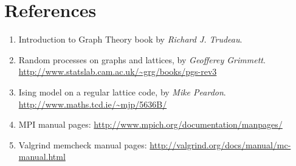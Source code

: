 \documentclass[pdftex,12pt,a4paper]{article}
\begin{document}
\newpage
\section{References}



\begin{enumerate}
\item Introduction to Graph Theory book by \emph{Richard J. Trudeau}. 
\item Random processes on graphs and lattices, by \emph{Geofferey Grimmett}. \url{http://www.statslab.cam.ac.uk/~grg/books/pgs-rev3}
\item Ising model on a regular lattice code, by \emph{Mike Peardon}. \url{http://www.maths.tcd.ie/~mjp/5636B/}
\item MPI manual pages: \url{http://www.mpich.org/documentation/manpages/}
\item Valgrind memcheck manual pages: \url{http://valgrind.org/docs/manual/mc-manual.html}
\end{enumerate}
\end{document}
